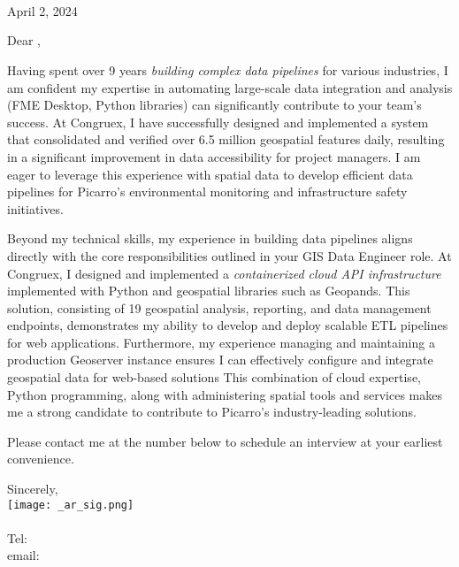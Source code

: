 \documentclass[letterpaper]{article}
\begin{document}
\large
\JobManager \\
\JobManagerTitle \\
\textbf{\JobCompany} \\

\null\hfill April 2, 2024

Dear \JobManagerShort,

Having spent over 9 years \emph{building complex data pipelines} for various
industries, I am confident my expertise in automating large-scale data
integration and analysis (FME Desktop, Python libraries) can significantly
contribute to your team's success.  At Congruex, I have
successfully designed and implemented a system that consolidated and verified
over 6.5 million geospatial features daily, resulting in a significant improvement
in data accessibility for project managers.  
I am eager to leverage this experience with spatial data to develop
efficient data pipelines for Picarro's environmental
monitoring and infrastructure safety initiatives.


Beyond my technical skills, my experience in building data pipelines aligns
directly with the core responsibilities outlined in your GIS Data Engineer role.
At Congruex, I designed and implemented a \emph{containerized cloud API
infrastructure} implemented with Python and geospatial libraries such as Geopands.
This solution,
consisting of 19 geospatial analysis, reporting, and data management endpoints,
demonstrates my ability to develop and deploy scalable ETL pipelines for web
applications.  Furthermore, my experience managing and maintaining a production
Geoserver instance ensures I can effectively configure and integrate geospatial
data for web-based solutions
This combination of cloud expertise, Python programming, along with 
administering spatial tools and services makes me a strong candidate to contribute to
Picarro's industry-leading solutions.

Please contact me at the number below to schedule an interview at your earliest convenience.

Sincerely,\\
    \hspace{1em}
    \texttt{[image: \_ar\_sig.png]} \\
    \CVsigname \\
    \small
    Tel: \CVphone \\
    email: \CVemail
\end{document}
